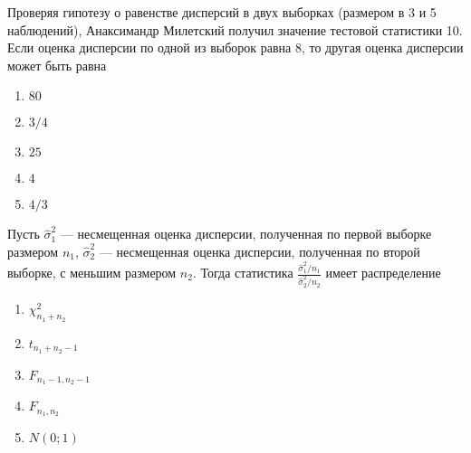 \documentclass[t]{beamer}
\begin{document}
 \begin{frame} \label{23} 
\begin{block}{23} 

Проверяя гипотезу о равенстве дисперсий в двух выборках (размером в 3 и 5 наблюдений), Анаксимандр Милетский получил значение тестовой статистики 10. Если оценка дисперсии по одной из выборок равна 8, то другая оценка дисперсии может быть равна
 


 \end{block} 
\begin{enumerate} 
\item[] \hyperlink{23-Yes}{\beamergotobutton{} $80$}
\item[] \hyperlink{23-No}{\beamergotobutton{} $3/4$}
\item[] \hyperlink{23-No}{\beamergotobutton{} $25$}
\item[] \hyperlink{23-No}{\beamergotobutton{} $4$}
\item[] \hyperlink{23-No}{\beamergotobutton{} $4/3$}
\end{enumerate} 
\end{frame} 


 \begin{frame} \label{24} 
\begin{block}{24} 

Пусть  $\hat{\sigma}^2_1$ — несмещенная оценка дисперсии, полученная по первой выборке размером $n_1$,   $\hat{\sigma}^2_2$ — несмещенная оценка дисперсии, полученная по второй выборке, с меньшим размером  $n_2$. Тогда статистика $\frac{\hat{\sigma}^2_1/n_1}{\hat{\sigma}^2_2/n_2}$  имеет распределение
 


 \end{block} 
\begin{enumerate} 
\item[] \hyperlink{24-No}{\beamergotobutton{} $\chi^2_{n_1+n_2}$}
\item[] \hyperlink{24-No}{\beamergotobutton{} $t_{n_1+n_2-1}$}
\item[] \hyperlink{24-No}{\beamergotobutton{} $F_{n_1-1,n_2-1}$}
\item[] \hyperlink{24-No}{\beamergotobutton{} $F_{n_1,n_2}$}
\item[] \hyperlink{24-No}{\beamergotobutton{} $N(0;1)$}
\end{enumerate} 
\end{frame} 
\end{document}
